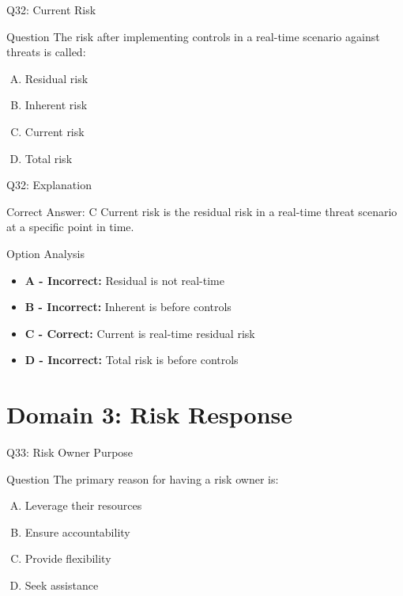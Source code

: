\documentclass{beamer}
\begin{document}
	\begin{frame}{Q32: Current Risk}
		\begin{block}{Question}
			The risk after implementing controls in a real-time scenario against threats is called:
		\end{block}
		\begin{enumerate}[(A)]
			\item Residual risk
			\item Inherent risk
			\item Current risk
			\item Total risk
		\end{enumerate}
	\end{frame}
	
	\begin{frame}{Q32: Explanation}
		\begin{block}{Correct Answer: C}
			Current risk is the residual risk in a real-time threat scenario at a specific point in time.
		\end{block}
		\begin{block}{Option Analysis}
			\begin{itemize}
				\item \textbf{A - Incorrect:} Residual is not real-time
				\item \textbf{B - Incorrect:} Inherent is before controls
				\item \textbf{C - Correct:} Current is real-time residual risk
				\item \textbf{D - Incorrect:} Total risk is before controls
			\end{itemize}
		\end{block}
	\end{frame}
	
	
	\section{Domain 3: Risk Response}
	
	\begin{frame}{Q33: Risk Owner Purpose}
		\begin{block}{Question}
			The primary reason for having a risk owner is:
		\end{block}
		\begin{enumerate}[(A)]
			\item Leverage their resources
			\item Ensure accountability
			\item Provide flexibility
			\item Seek assistance
		\end{enumerate}
	\end{frame}
	
\end{document}
